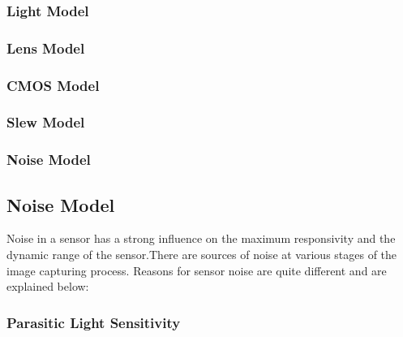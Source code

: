 \documentclass[../../main.tex]{subfiles}
\begin{document}
\subsubsection{Light Model}
\blindtext

\subsubsection{Lens Model} %
\blindtext

\subsubsection{CMOS Model} %
\blindtext

\subsubsection{Slew Model} %
\blindtext


\subsubsection{Noise Model} %
\blindtext






\subsection{Noise Model}
Noise in a sensor has a strong influence on the maximum responsivity and the dynamic range of the sensor.There are sources of noise at various stages of the image capturing process. Reasons for sensor noise are quite different and are explained below:



\subsubsection{Parasitic Light Sensitivity} %
\blindtext
\end{document}
